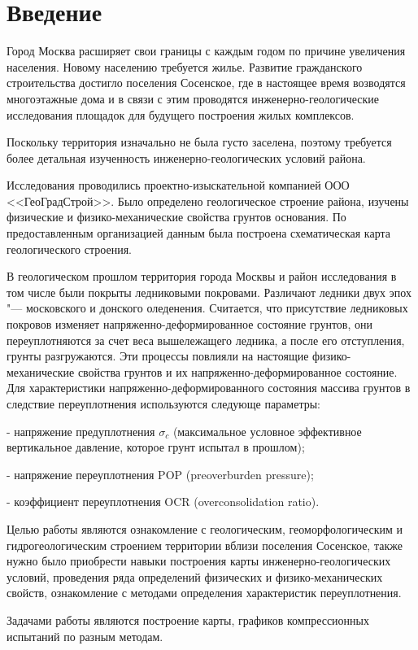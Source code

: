\chapter*{Введение}                         %

Город Москва расширяет свои границы с каждым годом по причине увеличения населения. 
Новому населению требуется жилье. Развитие гражданского строительства достигло поселения 
Сосенское, где в настоящее время возводятся многоэтажные дома и в связи с этим проводятся 
инженерно-геологические исследования площадок для будущего построения жилых комплексов.

Поскольку территория изначально не была густо заселена, поэтому требуется более детальная 
изученность инженерно-геологических условий района.

Исследования проводились проектно-изыскательной компанией ООО <<ГеоГрадСтрой>>. 
Было определено геологическое строение района, изучены физические и физико-механические свойства грунтов основания. 
По предоставленным организацией данным была построена схематическая карта геологического строения.

В геологическом прошлом территория города Москвы и район исследования в том числе были 
покрыты ледниковыми покровами. Различают ледники двух эпох "--- московского и донского оледенения. 
Считается, что присутствие ледниковых покровов изменяет напряженно-деформированное состояние 
грунтов, они переуплотняются за счет веса вышележащего ледника, а после его отступления, 
грунты разгружаются. Эти процессы повлияли на настоящие физико-механические свойства грунтов 
и их напряженно-деформированное состояние. Для характеристики напряженно-деформированного 
состояния массива грунтов в следствие переуплотнения используются следующе параметры:

- напряжение предуплотнения $\sigma_c$ (максимальное условное эффективное вертикальное давление, 
которое грунт испытал в прошлом);

- напряжение переуплотнения POP (preoverburden pressure);

- коэффициент переуплотнения OCR (overconsolidation ratio).

Целью работы являются ознакомление с геологическим, геоморфологическим и 
гидрогеологическим строением территории вблизи поселения Сосенское, также 
нужно было приобрести навыки построения карты инженерно-геологических 
условий, проведения ряда определений физических и физико-механических 
свойств, ознакомление с методами определения характеристик переуплотнения.

Задачами работы являются построение карты, графиков компрессионных испытаний 
по разным методам. 